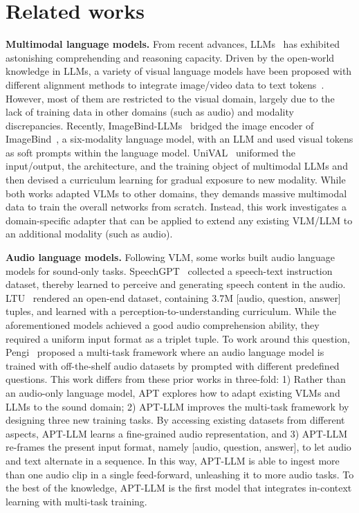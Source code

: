 \section{Related works} \label{sec:related_works}
\textbf{Multimodal language models.}
From recent advances, LLMs~\citep{touvron_llama_2023,chiang_vicuna_2023,openai_gpt-4_2023} has exhibited astonishing comprehending and reasoning capacity. Driven by the open-world knowledge in LLMs, a variety of visual language models have been proposed with different alignment methods to integrate image/video data to text tokens~\citep{alayrac_flamingo_2022,li_blip-2_2023,dai_instructblip_2023,zhang_llama-adapter_2023}. However, most of them are restricted to the visual domain, largely due to the lack of training data in other domains (such as audio) and modality discrepancies. Recently, ImageBind-LLMs~\citep{han_imagebind-llm_2023} bridged the image encoder of ImageBind~\citep{girdhar_imagebind_2023}, a six-modality language model, with an LLM and used visual tokens as soft prompts within the language model. UniVAL~\citep{shukor_unified_2023} uniformed the input/output, the architecture, and the training object of multimodal LLMs and then devised a curriculum learning for gradual exposure to new modality. While both works adapted VLMs to other domains, they demands massive multimodal data to train the overall networks from scratch. Instead, this work investigates a domain-specific adapter that can be applied to extend any existing VLM/LLM to an additional modality (such as audio). 

\textbf{Audio language models.} Following VLM, some works built audio language models for sound-only tasks. SpeechGPT~\citep{zhang_speechgpt_2023} collected a speech-text instruction dataset, thereby learned to perceive and generating speech content in the audio. LTU~\citep{gong_listen_2023} rendered an open-end dataset, containing 3.7M [audio, question, answer] tuples, and learned with a perception-to-understanding curriculum. While the aforementioned models achieved a good audio comprehension ability, they required a uniform input format as a triplet tuple. To work around this question, Pengi~\citep{deshmukh_pengi_2023} proposed a multi-task framework where an audio language model is trained with off-the-shelf audio datasets by prompted with different predefined questions. This work differs from these prior works in three-fold: 1) Rather than an audio-only language model, APT explores how to adapt existing VLMs and LLMs to the sound domain; 2) APT-LLM improves the multi-task framework by designing three new training tasks. By accessing existing datasets from different aspects, APT-LLM learns a fine-grained audio representation, and 3) APT-LLM re-frames the present input format, namely [audio, question, answer], to let audio and text alternate in a sequence. In this way, APT-LLM is able to ingest more than one audio clip in a single feed-forward, unleashing it to more audio tasks. To the best of the knowledge, APT-LLM is the first model that integrates in-context learning with multi-task training.

